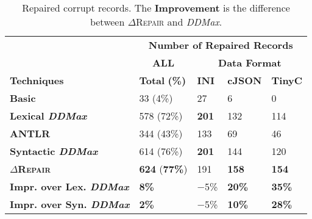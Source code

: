 \documentclass[acmsmall,screen,review,anonymous]{acmart}
\newcommand{\formatfree}{format-free\xspace}
\newcommand{\formatdependent}{format-dependent\xspace}
\newcommand{\dtask}{data repair\xspace}
\newcommand{\approach}{\textsc{$\Delta$Repair}\xspace}
\newcommand{\ddmax}{\textit{DDMax}\xspace}
\newcommand{\drepair}{\approach}
\begin{document}
\begin{table}[!tbp]
\centering
  \caption{Repaired corrupt records. The \textbf{Improvement} is the difference between \drepair and \ddmax.}
\begin{tabular}{|p{4.0cm}|p{1.5cm}|p{1.5cm}|p{1.5cm}|p{1.5cm}|}
\hline
&  \multicolumn{4}{c|}{\textbf{Number of Repaired Records}}  \\
&  \multicolumn{1}{c|}{\textbf{ALL}} & \multicolumn{3}{c|}{\textbf{Data Format}}  \\
\textbf{Techniques} & \textbf{Total} \textbf{(\%)} & \textbf{INI} & \textbf{cJSON} & \textbf{TinyC} \\
\hline
\textbf{Basic}   & 33 (4\%) & 27	 & 6 &	0\\
\textbf{Lexical \ddmax} & 578 (72\%) & \textbf{201}  & 132  & 114  \\ 		
\hline
\textbf{ANTLR} & 344 (43\%) & 133 & 69 & 46   \\
\textbf{Syntactic \ddmax} & 614 (76\%) & \textbf{201}  & 144  & 120  \\ 	
\hline
\textbf{\approach}  & \textbf{624} (\textbf{77\%}) & 191 & \textbf{158}  & \textbf{154} \\
\hline
 \textbf{Impr. over Lex. \ddmax} &  \textbf{8\%}  & $-$5\% & \textbf{20\%} & \textbf{35\%} \\
  \textbf{Impr. over Syn. \ddmax} &  \textbf{2\%}  & $-$5\% & \textbf{10\%} & \textbf{28\%} \\
\hline
\end{tabular}
\label{tab:effectiveness}
\end{table}
\end{document}
